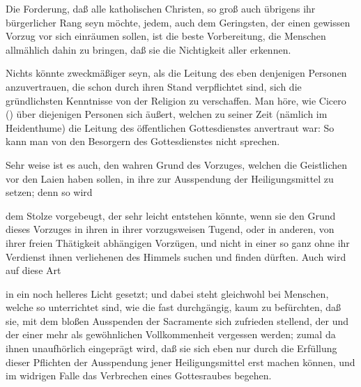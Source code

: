 \begin{aufza}
\item Die Forderung, daß alle katholischen Christen, so groß auch übrigens ihr bürgerlicher Rang seyn möchte, jedem, auch dem Geringsten, der  einen gewissen Vorzug vor sich einräumen sollen, ist die beste Vorbereitung, die Menschen allmählich dahin zu bringen, daß sie die Nichtigkeit aller  erkennen.
\item \begin{aufzb} \item Nichts könnte zweckmäßiger seyn, als die Leitung des  eben denjenigen Personen anzuvertrauen, die schon durch ihren Stand verpflichtet sind, sich die gründlichsten Kenntnisse von der Religion zu verschaffen. Man höre, wie Cicero () über diejenigen Personen sich äußert, welchen zu seiner Zeit (nämlich im Heidenthume) die Leitung des öffentlichen Gottesdienstes anvertraut war:  So kann man von den Besorgern des  Gottesdienstes nicht sprechen.
\item Sehr weise ist es auch, den wahren Grund des Vorzuges, welchen die Geistlichen vor den Laien haben sollen, in ihre  zur Ausspendung der Heiligungsmittel zu setzen; denn so wird~
\begin{aufzc}
\item dem Stolze vorgebeugt, der sehr leicht entstehen könnte, wenn sie den Grund dieses Vorzuges in ihren  in ihrer vorzugsweisen Tugend, oder in anderen, von ihrer freien Thätigkeit abhängigen Vorzügen, und nicht in einer so ganz ohne ihr Verdienst ihnen verliehenen  des Himmels suchen und finden dürften. Auch wird auf diese Art
\item {} in ein noch helleres Licht gesetzt; und dabei steht gleichwohl bei Menschen, welche so unterrichtet sind, wie die  fast durchgängig, kaum zu befürchten, daß sie, mit dem bloßen Ausspenden der Sacramente sich zufrieden stellend, der  und der  einer mehr als gewöhnlichen Vollkommenheit vergessen werden; zumal da ihnen unaufhörlich eingeprägt wird, daß sie sich eben nur durch die Erfüllung dieser Pflichten der Ausspendung jener Heiligungsmittel erst  machen können, und im widrigen Falle das Verbrechen eines Gottesraubes begehen.

\end{aufzc}
\end{aufzb}
\end{aufza}
